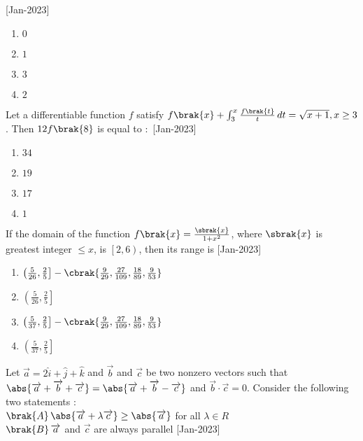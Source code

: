     \hfill{[Jan-2023]}
        \begin{enumerate}
            \item  $0$
            \item $1$
            \item $3$
            \item $2$
        \end{enumerate}
    \item Let a differentiable function $f$ satisfy $f\brak{x}+\int_{3}^{x}\frac{f\brak{t}}{t} \, dt=\sqrt{x+1},x\geq 3$. Then $12f\brak{8}$ is equal to $\colon$
    \hfill{[Jan-2023]}
        \begin{enumerate}
            \item $34$
            \item $19$
            \item $17$
            \item $1$
        \end{enumerate}
    \item If the domain of the function $f\brak{x}=\frac{\sbrak{x}}{1+x^2}$, where $\sbrak{x}$ is greatest integer $\leq x$, is $\left[2,6 \right)$, then its range is 
    \hfill{[Jan-2023]}
        \begin{enumerate}
            \item $\left(\frac{5}{26},\frac{2}{5} \right]-\cbrak{\frac{9}{29},\frac{27}{109},\frac{18}{89},\frac{9}{53}}$
            \item $\left(\frac{5}{26},\frac{2}{5} \right]$
            \item $\left(\frac{5}{37},\frac{2}{5} \right]-\cbrak{\frac{9}{29},\frac{27}{109},\frac{18}{89},\frac{9}{53}}$
            \item $\left(\frac{5}{37},\frac{2}{5} \right]$
        \end{enumerate}
    \item Let $\overrightarrow{a}=2\hat{i}+\hat{j}+\hat{k}$ and $\overrightarrow{b}$ and $\overrightarrow{c}$ be two nonzero vectors such that $\abs{\overrightarrow{a}+\overrightarrow{b}+\overrightarrow{c}}=\abs{\overrightarrow{a}+\overrightarrow{b}-\overrightarrow{c}}$ and $\overrightarrow{b}\cdot\overrightarrow{c}=0$. Consider the following two statements $\colon$\\
    $\brak{A}\,\abs{\overrightarrow{a}+\lambda\overrightarrow{c}}\geq\abs{\overrightarrow{a}}$ for all $\lambda\in R$\\
    $\brak{B}\,\overrightarrow{a}$ and $\overrightarrow{c}$ are always parallel 
    \hfill{[Jan-2023]}
